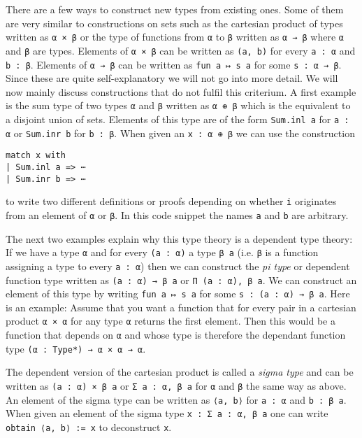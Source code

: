 There are a few ways to construct new types from existing ones. 
Some of them are very similar to constructions on sets such as the cartesian product of types written as \lstinline{α × β} or the type of functions from \lstinline{α} to \lstinline{β} written as \lstinline{α → β} where \lstinline{α} and \lstinline{β} are types.
Elements of \lstinline{α × β} can be written as \lstinline{(a, b)} for every \lstinline{a : α} and \lstinline{b : β}.
Elements of \lstinline{α → β} can be written as \lstinline{fun a ↦ s a} for some \lstinline{s : α → β}. 
Since these are quite self-explanatory we will not go into more detail.
We will now mainly discuss constructions that do not fulfil this criterium. 
A first example is the sum type of two types \lstinline{α} and \lstinline{β} written as \lstinline{α ⊕ β} which is the equivalent to a disjoint union of sets. 
Elements of this type are of the form \lstinline{Sum.inl a} for \lstinline{a : α} or \lstinline{Sum.inr b} for \lstinline{b : β}.
When given an \lstinline{x : α ⊕ β} we can use the construction 

\begin{lstlisting}
match x with 
| Sum.inl a => ⋯ 
| Sum.inr b => ⋯
\end{lstlisting}

to write two different definitions or proofs depending on whether \lstinline{i} originates from an element of \lstinline{α} or \lstinline{β}. 
In this code snippet the names \lstinline{a} and \lstinline{b} are arbitrary.

The next two examples explain why this type theory is a dependent type theory:
If we have a type \lstinline{α} and for every \lstinline{(a : α)} a type \lstinline{β a} (i.e. \lstinline{β} is a function assigning a type to every \lstinline{a : α}) then we can construct the \emph{pi type} or dependent function type written as \lstinline{(a : α) → β a} or \lstinline{Π (a : α), β a}. 
We can construct an element of this type by writing \lstinline{fun a ↦ s a} for some \lstinline{s : (a : α) → β a}. 
Here is an example: 
Assume that you want a function that for every pair in a cartesian product \lstinline{α × α} for any type \lstinline{α} returns the first element. 
Then this would be a function that depends on \lstinline{α} and whose type is therefore the dependant function type \lstinline{(α : Type*) → α × α → α}.

The dependent version of the cartesian product is called a \emph{sigma type} and can be written as \lstinline{(a : α) × β a} or \lstinline{Σ a : α, β a} for \lstinline{α} and \lstinline{β} the same way as above. 
An element of the sigma type can be written as \lstinline{⟨a, b⟩} for \lstinline{a : α} and \lstinline{b : β a}. 
When given an  element of the sigma type \lstinline{x : Σ a : α, β a} one can write \lstinline{obtain ⟨a, b⟩ := x} to deconstruct \lstinline{x}.